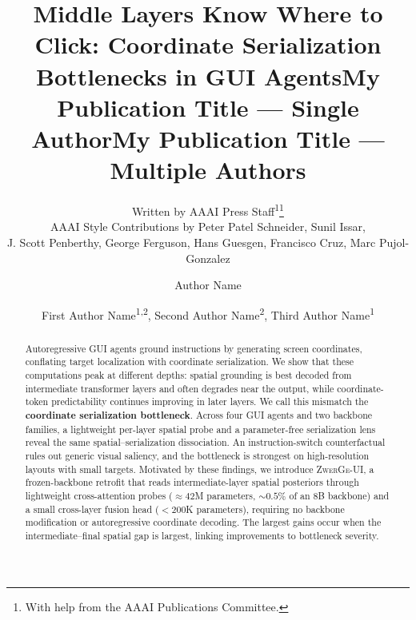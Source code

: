 \documentclass[letterpaper]{article} %
\title{Middle Layers Know Where to Click: Coordinate Serialization Bottlenecks in GUI Agents}
\author{
    Written by AAAI Press Staff\textsuperscript{\rm 1}\thanks{With help from the AAAI Publications Committee.}\\
    AAAI Style Contributions by Peter Patel Schneider,
    Sunil Issar,\\
    J. Scott Penberthy,
    George Ferguson,
    Hans Guesgen,
    Francisco Cruz\equalcontrib\corresponding,
    Marc Pujol-Gonzalez\equalcontrib\corresponding
}
\title{My Publication Title --- Single Author}
\author {
    Author Name
}
\title{My Publication Title --- Multiple Authors}
\author {
    First Author Name\textsuperscript{\rm 1,\rm 2}\equalcontrib,
    Second Author Name\textsuperscript{\rm 2}\equalcontrib,
    Third Author Name\textsuperscript{\rm 1}\corresponding
}
\begin{document}
\maketitle

\begin{abstract}
Autoregressive GUI agents ground instructions by generating screen coordinates, conflating target localization with coordinate serialization.
We show that these computations peak at different depths: spatial grounding is best decoded from intermediate transformer layers and often degrades near the output, while coordinate-token predictability continues improving in later layers.
We call this mismatch the \textbf{coordinate serialization bottleneck}.
Across four GUI agents and two backbone families, a lightweight per-layer spatial probe and a parameter-free serialization lens reveal the same spatial--serialization dissociation.
An instruction-switch counterfactual rules out generic visual saliency, and the bottleneck is strongest on high-resolution layouts with small targets.
Motivated by these findings, we introduce \textsc{ZwerGe-UI}, a frozen-backbone retrofit that reads intermediate-layer spatial posteriors through lightweight cross-attention probes (${\approx}42$M parameters, ${\sim}0.5\%$ of an 8B backbone) and a small cross-layer fusion head ($<\!200$K parameters), requiring no backbone modification or autoregressive coordinate decoding.
The largest gains occur when the intermediate--final spatial gap is largest, linking improvements to bottleneck severity.
\end{abstract}













% 

\appendix


\end{document}
